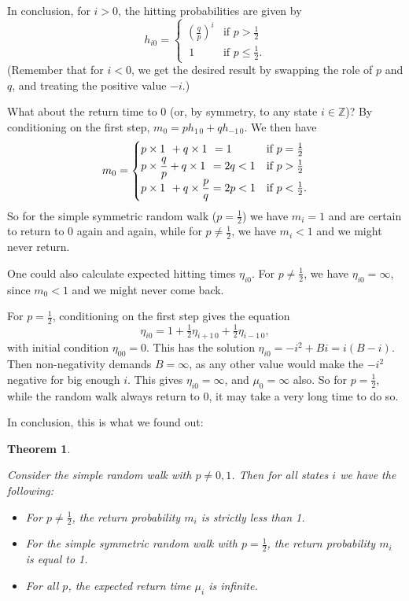 \documentclass[
  a4paper,
]{article}
\providecommand{\tightlist}{%
  \setlength{\itemsep}{0pt}\setlength{\parskip}{0pt}}
\newtheorem{theorem}{Theorem}[section]
\theoremstyle{definition}
\theoremstyle{definition}
\theoremstyle{definition}
\theoremstyle{remark}
\begin{document}
In conclusion, for \(i > 0\), the hitting probabilities are given by
\[ h_{i0} = \begin{cases} \left(\displaystyle\frac{q}{p}\right)^i & \text{if $p > \frac12$} \\ \ 1 & \text{if $p \leq \frac12$.} \end{cases} \]
(Remember that for \(i < 0\), we get the desired result by swapping the role of \(p\) and \(q\), and treating the positive value \(-i\).)

What about the return time to \(0\) (or, by symmetry, to any state \(i \in \mathbb Z\))? By conditioning on the first step, \(m_0 = ph_{1\,0} + qh_{-1\,0}\). We then have
\[ m_0 = \begin{cases} p\times 1 \hspace{0.4em}+ q\times 1 \hspace{0.4em}= 1 & \text{if $p = \frac12$} \\
p \times \displaystyle\frac qp + q\times 1 \hspace{0.4em}= 2q < 1 & \text{if $p > \frac12$} \\
p\times 1 \hspace{0.4em} + q \times \displaystyle\frac pq = 2p < 1 & \text{if $p < \frac12$.}\end{cases} \]
So for the simple symmetric random walk (\(p = \frac12\)) we have \(m_i = 1\) and are certain to return to \(0\) again and again, while for \(p \neq \frac12\), we have \(m_i < 1\) and we might never return.

One could also calculate expected hitting times \(\eta_{i0}\). For \(p \neq \frac12\), we have \(\eta_{i0} = \infty\), since \(m_0 < 1\) and we might never come back.

For \(p = \frac12\), conditioning on the first step gives the equation
\[ \eta_{i0} = 1 + \tfrac12\eta_{i+1\,0} + \tfrac12\eta_{i-1\,0} , \]
with initial condition \(\eta_{00} = 0\). This has the solution \(\eta_{i0} = -i^2 + Bi = i(B-i)\). Then non-negativity demands \(B = \infty\), as any other value would make the \(-i^2\) negative for big enough \(i\). This gives \(\eta_{i0} = \infty\), and \(\mu_0 = \infty\) also.
So for \(p = \frac12\), while the random walk always return to \(0\), it may take a very long time to do so.

In conclusion, this is what we found out:

\begin{theorem}
\protect\hypertarget{thm:rw-summary}{}\label{thm:rw-summary}

Consider the simple random walk with \(p \neq 0,1\). Then for all states \(i\) we have the following:

\begin{itemize}
\tightlist
\item
  For \(p \neq \frac12\), the return probability \(m_i\) is strictly less than 1.
\item
  For the simple symmetric random walk with \(p = \frac12\), the return probability \(m_i\) is equal to 1.
\item
  For all \(p\), the expected return time \(\mu_i\) is infinite.
\end{itemize}

\end{theorem}
\end{document}

